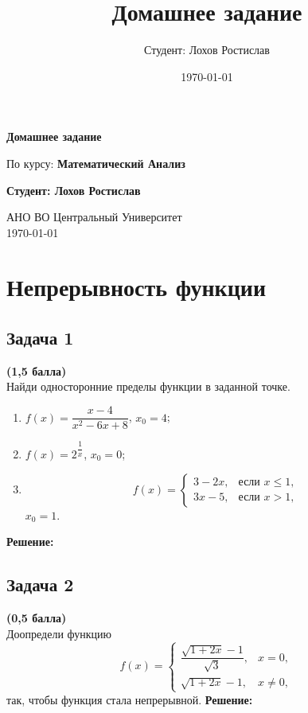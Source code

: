 \documentclass[a4paper,12pt]{article}
\title{Домашнее задание}
\author{Студент: Лохов Ростислав}
\date{\today}
\begin{document}
\begin{titlepage}
    \centering
    \vspace{1cm}

    \Huge
    \textbf{Домашнее задание}

    \vspace{0.5cm}
    \LARGE
    По курсу: \textbf{Математический Анализ}

    \vspace{1.5cm}

    \textbf{Студент: Лохов Ростислав}

    \vfill

    \Large
    АНО ВО Центральный Университет\\
    \vspace{0.3cm}
    \today

\end{titlepage}

\tableofcontents
\newpage

\section{Непрерывность функции}

\subsection{Задача 1}
\textbf{(1,5 балла)} \\
Найди односторонние пределы функции в заданной точке.
\begin{enumerate}[label=\alph*)]
    \item $f(x) = \dfrac{x - 4}{x^2 - 6x + 8}$, $x_0 = 4$;
    \item $f(x) = 2^{\dfrac{1}{x}}$, $x_0 = 0$;
    \item 
    \[
    f(x) =
    \begin{cases}
        3 - 2x, & \text{если } x \leq 1, \\
        3x - 5, & \text{если } x > 1,
    \end{cases}
    \]
    $x_0 = 1$.
\end{enumerate}
\textbf{Решение:}


\subsection{Задача 2}
\textbf{(0,5 балла)} \\
Доопредели функцию
\[
f(x) =
\begin{cases}
    \dfrac{\sqrt{1 + 2x} - 1}{\sqrt{3}}, & x = 0, \\
    \sqrt{1 + 2x} - 1, & x \neq 0,
\end{cases}
\]
так, чтобы функция стала непрерывной.
\textbf{Решение:}
\end{document}
